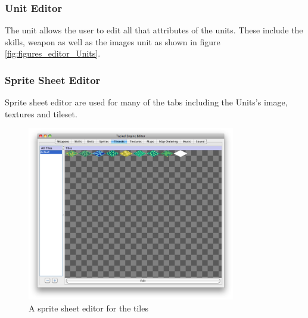 \subsubsection{Unit Editor}
\label{ssub:unit_editors}
The unit allows the user to edit all that attributes of the units. These include the skills, weapon as well as the images unit as shown in figure \ref{fig:figures_editor_Units}. 


\clearpage
\subsubsection{Sprite Sheet Editor}
Sprite sheet editor are used for many of the tabs including the Units's image, textures and tileset.
\begin{figure}[htbp]
	\centering
		\includegraphics[height=3in]{figures/editor/tileset_edit.png}
	\caption{A sprite sheet  editor for the tiles}
	\label{fig:figures_editor_tileset_edit}
\end{figure}


